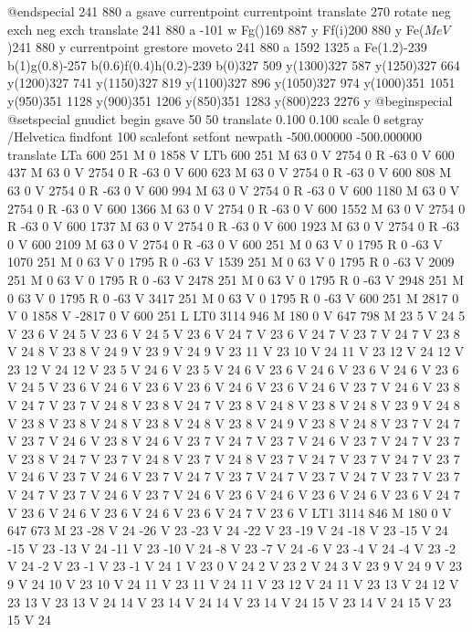 @endspecial
241 880 a
 gsave currentpoint currentpoint translate 270 rotate neg exch neg
exch translate
 241 880 a -101 w Fg()169 887 y Ff(i)200
880 y Fe(\(MeV\))241 880 y
 currentpoint grestore moveto
 241 880 a 1592 1325 a Fe(1.2)-239
b(1)g(0.8)-257 b(0.6)f(0.4)h(0.2)-239 b(0)327 509 y(1300)327
587 y(1250)327 664 y(1200)327 741 y(1150)327 819 y(1100)327
896 y(1050)327 974 y(1000)351 1051 y(950)351 1128 y(900)351
1206 y(850)351 1283 y(800)223 2276 y @beginspecial @setspecial
 gnudict begin gsave 50 50 translate 0.100 0.100 scale 0 setgray /Helvetica
findfont 100 scalefont setfont newpath -500.000000 -500.000000 translate
LTa 600 251 M 0 1858 V LTb 600 251 M 63 0 V 2754 0 R -63 0 V 600 437
M 63 0 V 2754 0 R -63 0 V 600 623 M 63 0 V 2754 0 R -63 0 V 600 808
M 63 0 V 2754 0 R -63 0 V 600 994 M 63 0 V 2754 0 R -63 0 V 600 1180
M 63 0 V 2754 0 R -63 0 V 600 1366 M 63 0 V 2754 0 R -63 0 V 600 1552
M 63 0 V 2754 0 R -63 0 V 600 1737 M 63 0 V 2754 0 R -63 0 V 600 1923
M 63 0 V 2754 0 R -63 0 V 600 2109 M 63 0 V 2754 0 R -63 0 V 600 251
M 0 63 V 0 1795 R 0 -63 V 1070 251 M 0 63 V 0 1795 R 0 -63 V 1539 251
M 0 63 V 0 1795 R 0 -63 V 2009 251 M 0 63 V 0 1795 R 0 -63 V 2478 251
M 0 63 V 0 1795 R 0 -63 V 2948 251 M 0 63 V 0 1795 R 0 -63 V 3417 251
M 0 63 V 0 1795 R 0 -63 V 600 251 M 2817 0 V 0 1858 V -2817 0 V 600
251 L LT0 3114 946 M 180 0 V 647 798 M 23 5 V 24 5 V 23 6 V 24 5 V
23 6 V 24 5 V 23 6 V 24 7 V 23 6 V 24 7 V 23 7 V 24 7 V 23 8 V 24 8
V 23 8 V 24 9 V 23 9 V 24 9 V 23 11 V 23 10 V 24 11 V 23 12 V 24 12
V 23 12 V 24 12 V 23 5 V 24 6 V 23 5 V 24 6 V 23 6 V 24 6 V 23 6 V
24 6 V 23 6 V 24 5 V 23 6 V 24 6 V 23 6 V 23 6 V 24 6 V 23 6 V 24 6
V 23 7 V 24 6 V 23 8 V 24 7 V 23 7 V 24 8 V 23 8 V 24 7 V 23 8 V 24
8 V 23 8 V 24 8 V 23 9 V 24 8 V 23 8 V 23 8 V 24 8 V 23 8 V 24 8 V
23 8 V 24 9 V 23 8 V 24 8 V 23 7 V 24 7 V 23 7 V 24 6 V 23 8 V 24 6
V 23 7 V 24 7 V 23 7 V 24 6 V 23 7 V 24 7 V 23 7 V 23 8 V 24 7 V 23
7 V 24 8 V 23 7 V 24 8 V 23 7 V 24 7 V 23 7 V 24 7 V 23 7 V 24 6 V
23 7 V 24 6 V 23 7 V 24 7 V 23 7 V 24 7 V 23 7 V 24 7 V 23 7 V 23 7
V 24 7 V 23 7 V 24 6 V 23 7 V 24 6 V 23 6 V 24 6 V 23 6 V 24 6 V 23
6 V 24 7 V 23 6 V 24 6 V 23 6 V 24 6 V 23 6 V 24 7 V 23 6 V LT1 3114
846 M 180 0 V 647 673 M 23 -28 V 24 -26 V 23 -23 V 24 -22 V 23 -19
V 24 -18 V 23 -15 V 24 -15 V 23 -13 V 24 -11 V 23 -10 V 24 -8 V 23
-7 V 24 -6 V 23 -4 V 24 -4 V 23 -2 V 24 -2 V 23 -1 V 23 -1 V 24 1 V
23 0 V 24 2 V 23 2 V 24 3 V 23 9 V 24 9 V 23 9 V 24 10 V 23 10 V 24
11 V 23 11 V 24 11 V 23 12 V 24 11 V 23 13 V 24 12 V 23 13 V 23 13
V 24 14 V 23 14 V 24 14 V 23 14 V 24 15 V 23 14 V 24 15 V 23 15 V 24
